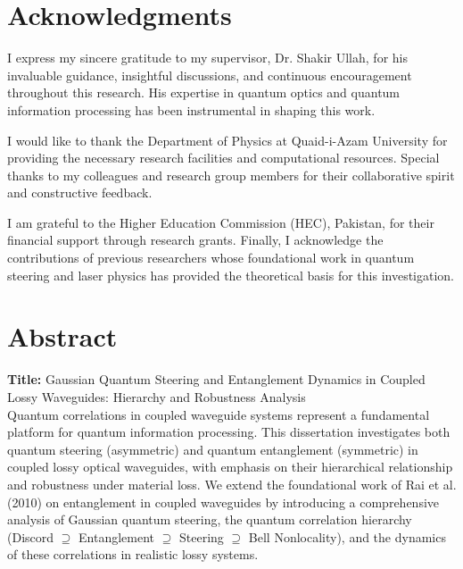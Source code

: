 \documentclass[12pt,a4paper]{report}
\begin{document}
\setcounter{page}{8}
\newpage

\chapter*{Acknowledgments}
I express my sincere gratitude to my supervisor, Dr. Shakir Ullah, for his invaluable guidance, insightful discussions, and continuous encouragement throughout this research. His expertise in quantum optics and quantum information processing has been instrumental in shaping this work.

I would like to thank the Department of Physics at Quaid-i-Azam University for providing the necessary research facilities and computational resources. Special thanks to my colleagues and research group members for their collaborative spirit and constructive feedback.

I am grateful to the Higher Education Commission (HEC), Pakistan, for their financial support through research grants. Finally, I acknowledge the contributions of previous researchers whose foundational work in quantum steering and laser physics has provided the theoretical basis for this investigation.

\newpage

\chapter*{Abstract}

\noindent \textbf{Title:} Gaussian Quantum Steering and Entanglement Dynamics in Coupled Lossy Waveguides: Hierarchy and Robustness Analysis\\[0.5cm]

Quantum correlations in coupled waveguide systems represent a fundamental platform for quantum information processing. This dissertation investigates both quantum steering (asymmetric) and quantum entanglement (symmetric) in coupled lossy optical waveguides, with emphasis on their hierarchical relationship and robustness under material loss. We extend the foundational work of Rai et al. (2010) on entanglement in coupled waveguides by introducing a comprehensive analysis of Gaussian quantum steering, the quantum correlation hierarchy (Discord $\supseteq$ Entanglement $\supseteq$ Steering $\supseteq$ Bell Nonlocality), and the dynamics of these correlations in realistic lossy systems.
\end{document}
